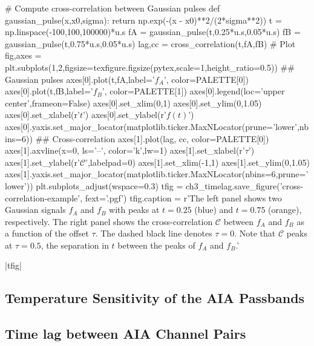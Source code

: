\begin{pycode}
# Compute cross-correlation between Gaussian pulses
def gaussian_pulse(x,x0,sigma):
    return np.exp(-(x - x0)**2/(2*sigma**2))
t = np.linspace(-100,100,100000)*u.s
fA = gaussian_pulse(t,0.25*u.s,0.05*u.s)
fB = gaussian_pulse(t,0.75*u.s,0.05*u.s)
lag,cc = cross_correlation(t,fA,fB)
# Plot
fig,axes = plt.subplots(1,2,figsize=texfigure.figsize(pytex,scale=1,height_ratio=0.5))
## Gaussian pulses
axes[0].plot(t,fA,label='$f_A$', color=PALETTE[0])
axes[0].plot(t,fB,label='$f_B$', color=PALETTE[1])
axes[0].legend(loc='upper center',frameon=False)
axes[0].set_xlim(0,1)
axes[0].set_ylim(0,1.05)
axes[0].set_xlabel(r'$t$')
axes[0].set_ylabel(r'$f(t)$')
axes[0].yaxis.set_major_locator(matplotlib.ticker.MaxNLocator(prune='lower',nbins=6))
## Cross-correlation
axes[1].plot(lag, cc, color=PALETTE[0])
axes[1].axvline(x=0, ls='--', color='k',lw=1)
axes[1].set_xlabel(r'$\tau$')
axes[1].set_ylabel(r'$\mathcal{C}$',labelpad=0)
axes[1].set_xlim(-1,1)
axes[1].set_ylim(0,1.05)
axes[1].yaxis.set_major_locator(matplotlib.ticker.MaxNLocator(nbins=6,prune='lower'))
plt.subplots_adjust(wspace=0.3)
tfig = ch3_timelag.save_figure('cross-correlation-example', fext='.pgf')
tfig.caption = r'The left panel shows two Gaussian signals $f_A$ and $f_B$ with peaks at $t=0.25$ (blue) and $t=0.75$ (orange), respectively. The right panel shows the cross-correlation $\mathcal{C}$ between $f_A$ and $f_B$ as a function of the offset $\tau$. The dashed black line denotes $\tau=0$. Note that $\mathcal{C}$ peaks at $\tau=0.5$, the separation in $t$ between the peaks of $f_A$ and $f_B$.'
\end{pycode}
|tfig|

\subsection{Temperature Sensitivity of the AIA Passbands}


\subsection{Time lag between AIA Channel Pairs}


